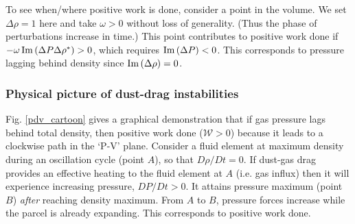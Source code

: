 To see when/where positive work is done, 
consider a point in the volume. We set $\Delta\rho = 1$ here 
and take $\omega>0$ without loss of generality. (Thus the phase of
perturbations increase in time.) This point contributes to positive
work done if $-\omega \operatorname{Im}\left(\Delta
P\Delta\rho^*\right)>0$, which requires $\operatorname{Im}\left(\Delta
P\right)<0$. This corresponds to pressure lagging behind density since
$\operatorname{Im}\left(\Delta\rho\right)=0$.   

\subsubsection{Physical picture of dust-drag instabilities} 


Fig. \ref{pdv_cartoon} gives a graphical demonstration that 
if gas pressure lags behind total density, then positive work done 
($\mathcal{W}>0$) because it leads to a clockwise path in the
`P-V' plane. Consider a fluid element at maximum density during an
oscillation cycle (point $A$), so that $D\rho/ D t = 0$. If dust-gas
drag provides an effective heating to the fluid element at $A$
(i.e. gas influx)  then it will experience increasing pressure, $DP/D
t>0$. It attains pressure maximum (point $B$) \emph{after} reaching
density maximum.    
From $A$ to $B$, pressure forces increase while the parcel is already
expanding. This corresponds to positive work done.    

